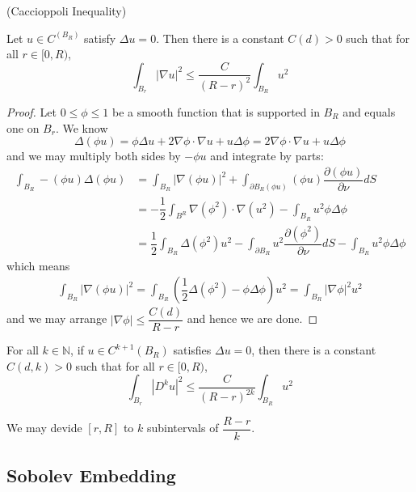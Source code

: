 \begin{theorem}
    (Caccioppoli Inequality)\par
    Let $u\in C^(B_R)$ satisfy $\Delta u = 0$. Then there is a constant $C(d) > 0$ such that for all $r\in[0,R)$,
    \[
    \int_{B_r}|\nabla u|^2 \leq \dfrac{C}{(R-r)^2}\int_{B_R} u^2
    \]
\end{theorem}
\begin{proof}
    Let $0\leq \phi \leq 1$ be a smooth function that is supported in $B_R$ and equals one on $B_r$. We know
    \[
    \Delta(\phi u) = \phi\Delta u + 2\nabla\phi \cdot\nabla u + u\Delta \phi = 2\nabla \phi\cdot \nabla u +u\Delta \phi
    \]
    and we may multiply both sides by $-\phi u$ and integrate by parts:
    \[
    \begin{aligned}
        \int_{B_R} -(\phi u)\Delta(\phi u) &= \int_{B_R} |\nabla(\phi u)|^2 + \int_{\partial B_R (\phi u)}(\phi u)\dfrac{\partial (\phi u)}{\partial\nu} dS \\
        &= - \dfrac{1}{2}\int_{B^R} \nabla(\phi^2)\cdot \nabla(u^2) - \int_{B_R} u^2 \phi \Delta \phi  \\
        &= \dfrac{1}{2}\int_{B_R}\Delta(\phi^2)u^2 - \int_{\partial B_R} u^2 \dfrac{\partial (\phi^2)}{\partial \nu} dS - \int_{B_R} u^2 \phi \Delta \phi
    \end{aligned}
    \]
    which means
    \[
    \begin{aligned}
        \int_{B_R}|\nabla(\phi u)|^2 = \int_{B_R}\left(\dfrac{1}{2}\Delta(\phi^2) - \phi\Delta \phi\right)u^2 = \int_{B_R}|\nabla \phi|^2 u^2
    \end{aligned}
    \]
    and we may arrange $|\nabla \phi| \leq \dfrac{C(d)}{R-r}$ and hence we are done.
\end{proof}

\begin{corollary}
    For all $k\in\mathbb{N}$, if $u \in C^{k+1}(B_R)$ satisfies $\Delta u = 0$, then there is a constant $C(d,k)>0$ such that for all $r\in[0,R)$,
    \[
    \int_{B_r}|D^k u|^2 \leq \dfrac{C}{(R-r)^{2k}}\int_{B_R}u^2
    \]
\end{corollary}
\begin{proposition}
    We may devide $[r,R]$ to $k$ subintervals of $\dfrac{R-r}{k}$. 
\end{proposition}

\subsection{Sobolev Embedding}


